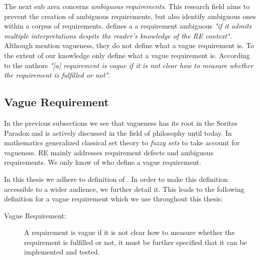 The next sub area concerns \textit{ambiguous requirements}.
This research field aims to prevent the creation of ambiguous requirements, but also identify ambiguous ones within a corpus of requirements.
\Textcite{Kamsties:2000} defines a a requirement ambiguous \textit{"if it admits multiple interpretations despite the reader’s knowledge of the RE context"}.
Although \textcite{Kamsties:2000} mention vagueness, they do not define what a vague requirement is.
To the extent of our knowledge only \textcite{Berry:2003} define what a vague requirement is.
According to the authors \textit{"[a] requirement is vague if it is not clear how to measure whether the requirement is fulfilled or not"}.

\subsection{Vague Requirement}
\label{chp:fundamentals:sec:vagueness:subsec:vague_requirement}
In the previous subsections we see that vagueness has its root in the Sorites Paradox and is actively discussed in the field of philosophy until today.
In mathematics \textcite{Zadeh:1965} generalized classical set theory to \textit{fuzzy sets} to take account for vagueness.
\Ac{RE} mainly addresses requirement defects and ambiguous requirements.
We only know of \textcite{Berry:2003} who define a vague requirement.

In this thesis we adhere to definition of \textcite{Berry:2003}.
In order to make this definition accessible to a wider audience, we further detail it.
This leads to the following definition for a vague requirement which we use throughout this thesis:
\begin{description}
    \item[Vague Requirement:] A requirement is vague if it is not clear how to measure whether the requirement is fulfilled or not, it must be further specified that it can be implemented and tested.
\end{description}
